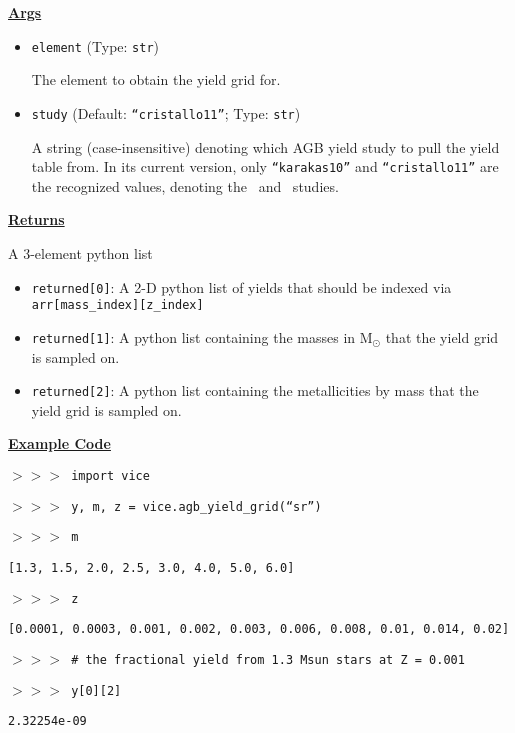 \documentclass{report}
\begin{document}
\null\par\noindent
\underline{\textbf{Args}}
\par
\begin{itemize}
	\item{ %
		\texttt{element} (Type: \texttt{str}) \par
		The element to obtain the yield grid for. 
	}

	\item{ %
		\texttt{study} (Default: \texttt{``cristallo11''}; Type: \texttt{str}) 
		\par
		A string (case-insensitive) denoting which AGB yield study to pull the 
		yield table from. In its current version, only \texttt{``karakas10''} 
		and \texttt{``cristallo11''} are the recognized values, denoting 
		the~\citet{Karakas2010} and~\citet{Cristallo2011} studies. 
	}
\end{itemize}

\null\par\noindent
\underline{\textbf{Returns}} 
\par\noindent 
A 3-element python list 
\begin{itemize}
	\item{
		\texttt{returned[0]}: A 2-D python list of yields that should be 
		indexed via \texttt{arr[mass\_index][z\_index]} 
	}

	\item{
		\texttt{returned[1]}: A python list containing the masses in M$_\odot$ 
		that the yield grid is sampled on. 
	}

	\item{
		\texttt{returned[2]}: A python list containing the metallicities by 
		mass that the yield grid is sampled on. 
	}
\end{itemize}

\par\null\par\noindent 
\underline{\textbf{Example Code}} 
\par\noindent 
\texttt{$>>>$ import vice} \par\noindent 
\texttt{$>>>$ y, m, z = vice.agb\_yield\_grid(``sr'')} \par\noindent 
\texttt{$>>>$ m} \par\noindent 
\texttt{[1.3, 1.5, 2.0, 2.5, 3.0, 4.0, 5.0, 6.0]} \par\noindent 
\texttt{$>>>$ z} \par\noindent 
\texttt{[0.0001, 0.0003, 0.001, 0.002, 0.003, 0.006, 0.008, 0.01, 0.014, 0.02]} 
\par\noindent 
\texttt{$>>>$ \# the fractional yield from 1.3 Msun stars at Z = 0.001}
\par\noindent 
\texttt{$>>>$ y[0][2]} \par\noindent 
\texttt{2.32254e-09}
\end{document}
